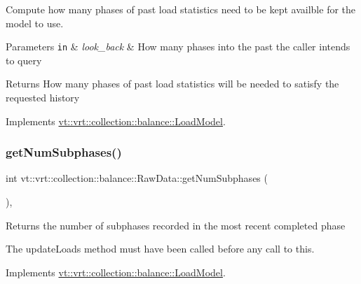 Compute how many phases of past load statistics need to be kept availble for the model to use. 


\begin{DoxyParams}[1]{Parameters}
\mbox{\tt in}  & {\em look\+\_\+back} & How many phases into the past the caller intends to query\\
\hline
\end{DoxyParams}
\begin{DoxyReturn}{Returns}
How many phases of past load statistics will be needed to satisfy the requested history 
\end{DoxyReturn}


Implements \hyperlink{classvt_1_1vrt_1_1collection_1_1balance_1_1_load_model_ac061725720a2017908090863080b70e5}{vt\+::vrt\+::collection\+::balance\+::\+Load\+Model}.

\mbox{\label{structvt_1_1vrt_1_1collection_1_1balance_1_1_raw_data_aeb7830328dfb72f11740e79eed6a23aa}} 
\subsubsection{\texorpdfstring{get\+Num\+Subphases()}{getNumSubphases()}}
{\footnotesize\ttfamily int vt\+::vrt\+::collection\+::balance\+::\+Raw\+Data\+::get\+Num\+Subphases (\begin{DoxyParamCaption}{ }\end{DoxyParamCaption})\hspace{0.3cm}{\ttfamily [override]}, {\ttfamily [virtual]}}

Returns the number of subphases recorded in the most recent completed phase

The {\ttfamily update\+Loads} method must have been called before any call to this. 

Implements \hyperlink{classvt_1_1vrt_1_1collection_1_1balance_1_1_load_model_ab46ea62e4228d4a64de9dd0adfe81af2}{vt\+::vrt\+::collection\+::balance\+::\+Load\+Model}.

\mbox{\label{structvt_1_1vrt_1_1collection_1_1balance_1_1_raw_data_abb4ce5d944f229b411d9a3b61f370822}} 
